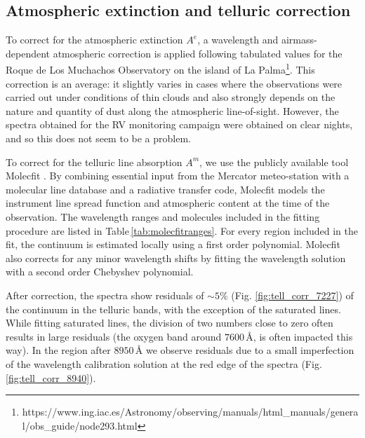 \subsection{Atmospheric extinction and telluric correction}
\label{sec:atm_corr}
To correct for the atmospheric extinction $A^e$, a wavelength and airmass-dependent atmospheric correction is applied following tabulated values for the Roque de Los Muchachos Observatory on the island of La Palma\footnote{https://www.ing.iac.es/Astronomy/observing/manuals/html\_manuals/general/obs\_guide/node293.html}. This correction is an average: it slightly varies in cases where the observations were carried out under conditions of thin clouds and also strongly depends on the nature and quantity of dust along the atmospheric line-of-sight. However, the spectra obtained for the RV monitoring campaign were obtained on clear nights, and so this does not seem to be a problem.

To correct for the telluric line absorption $A^m$, we use the publicly available tool Molecfit \citep{smette_molecfit_2015,kausch_molecfit_2015}. By combining essential input from the Mercator meteo-station with a molecular line database and a radiative transfer code, Molecfit models the instrument line spread function and atmospheric content at the time of the observation. The wavelength ranges and molecules included in the fitting procedure are listed in Table\,\ref{tab:molecfitranges}. For every region included in the fit, the continuum is estimated locally using a first order polynomial. Molecfit also corrects for any minor wavelength shifts by fitting the wavelength solution with a second order Chebyshev polynomial.

After correction, the spectra show residuals of $\sim\!\!5\%$ (Fig. \ref{fig:tell_corr_7227}) of the continuum in the telluric bands, with the exception of the saturated lines. While fitting saturated lines, the division of two numbers close to zero often results in large residuals (the oxygen band around $7600\,$\r{A}, is often impacted this way). In the region after $8950\,$\r{A} we observe residuals due to a small imperfection of the wavelength calibration solution at the red edge of the spectra (Fig. \ref{fig:tell_corr_8940}).

